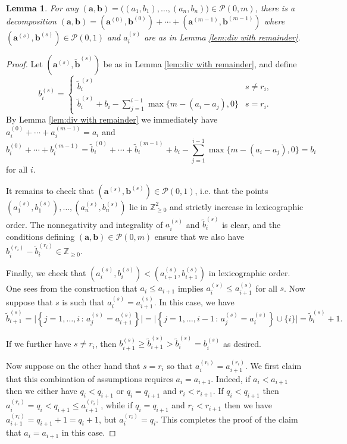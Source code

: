 \documentclass[10pt,a4paper]{amsart}
\newtheorem{lemma}{Lemma}
\newcommand{\Z}{\mathbb{Z}}
\newcommand{\aaa}{\mathbf{a}}
\newcommand{\bbb}{\mathbf{b}}
\begin{document}
\begin{lemma}\label{lem:k=0 decomp}
    For any $(\aaa,\bbb) = \big( (a_1,b_1),\dots,(a_n,b_n) \big)\in \mathcal{P}(0,m)$, there is a decomposition $(\aaa,\bbb) = \left(\aaa^{(0)},\bbb^{(0)}\right)+\cdots+\left(\aaa^{(m-1)},\bbb^{(m-1)}\right)$ where $\left(\aaa^{(s)},\bbb^{(s)}\right)\in \mathcal{P}(0,1)$ and $a_i^{(s)}$ are as in Lemma \ref{lem:div with remainder}.
\end{lemma}

\begin{proof}
    Let $\left(\aaa^{(s)},\tilde{\bbb}^{(s)}\right)$ be as in Lemma \ref{lem:div with remainder}, and define
    \[ b^{(s)}_i = \begin{cases}
        \tilde{b}^{(s)}_i & s\neq r_i,\\
        \tilde{b}^{(s)}_i + b_i- \sum_{j=1}^{i-1}\max\{m-(a_i-a_j),0\} & s=r_i.
    \end{cases} \]
    By Lemma \ref{lem:div with remainder} we immediately have $a^{(0)}_i+\cdots+a^{(m-1)}_i = a_i$ and 
    \[ b^{(0)}_i+\cdots+b^{(m-1)}_i = \tilde{b}^{(0)}_i+\cdots+\tilde{b}^{(m-1)}_i + b_i- \sum_{j=1}^{i-1}\max\{m-(a_i-a_j),0\} =b_i \]
    for all $i$.  
    
    It remains to check that $\left(\aaa^{(s)},\bbb^{(s)}\right)\in \mathcal{P}(0,1)$, i.e. that the points $\left(a^{(s)}_1,b^{(s)}_1\right),\dots,\left(a^{(s)}_n,b^{(s)}_n\right)$ lie in $\Z^2_{\geq 0}$ and strictly increase in lexicographic order. The nonnegativity and integrality of $a^{(s)}_i$ and $\tilde{b}^{(s)}_i$ is clear, and the conditions defining $(\aaa,\bbb)\in \mathcal{P}(0,m)$ ensure that we also have $b^{(r_i)}_i -\tilde{b}^{(r_i)}_i \in \Z_{\geq 0}.$

    Finally, we check that $\left(a^{(s)}_i,b^{(s)}_i\right)<\left(a^{(s)}_{i+1},b^{(s)}_{i+1}\right)$ in lexicographic order. One sees from the construction that $a_i\leq a_{i+1}$ implies $a_i^{(s)}\leq a_{i+1}^{(s)}$ for all $s$. Now suppose that $s$ is such that $a_i^{(s)}= a_{i+1}^{(s)}$. In this case, we have 
    \[ \tilde{b}^{(s)}_{i+1} = \big|\left\{ j=1,\dots,i \, : \, a^{(s)}_j = a^{(s)}_{i+1} \right\}\big| = \big|\left\{ j=1,\dots,i-1 \, : \, a^{(s)}_j = a^{(s)}_{i} \right\}\cup \{i\} \big| = \tilde{b}^{(s)}_{i}+1. \]
    
    If we further have $s\neq r_i$, then $b^{(s)}_{i+1}\geq \tilde{b}^{(s)}_{i+1}> \tilde{b}^{(s)}_{i} = b^{(s)}_{i}$ as desired. 

    Now suppose on the other hand that $s=r_i$ so that $a_i^{(r_i)}= a_{i+1}^{(r_i)}$. We first claim that this combination of assumptions requires $a_i=a_{i+1}$. Indeed, if $a_i<a_{i+1}$ then we either have $q_i<q_{i+1}$ or $q_i=q_{i+1}$ and $r_i<r_{i+1}$. If $q_i<q_{i+1}$ then $a_i^{(r_i)} = q_i<q_{i+1}\leq a_{i+1}^{(r_i)}$, while if $q_i=q_{i+1}$ and $r_i<r_{i+1}$ then we have $a^{(r_i)}_{i+1} = q_{i+1}+1=q_i+1$, but $a^{(r_i)}_i = q_i$. This completes the proof of the claim that $a_i=a_{i+1}$ in this case.


\end{proof}
\end{document}
